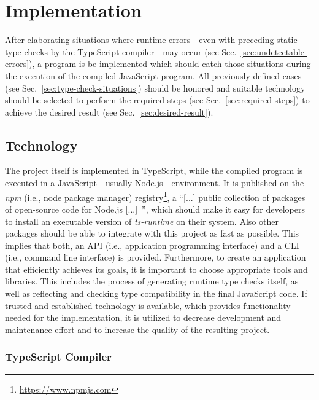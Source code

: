 \chapter{Implementation}
\label{cha:implementation}

After elaborating situations where runtime errors---even with preceding static type checks by the TypeScript compiler---may occur (see Sec.~\ref{sec:undetectable-errors}), a program is be implemented which should catch those situations during the execution of the compiled JavaScript program. All previously defined cases (see Sec.~\ref{sec:type-check-situations}) should be honored and suitable technology should be selected to perform the required steps (see Sec.~\ref{sec:required-steps}) to achieve the desired result (see Sec.~\ref{sec:desired-result}).

\section{Technology}
\label{sec:technology}

The project itself is implemented in TypeScript, while the compiled program is executed in a JavaScript---usually Node.js---environment. It is published on the \emph{npm} (i.e., node package manager) registry\footnote{\url{https://www.npmjs.com}}, a ``[...] public collection of packages of open-source code for Node.js [...]~\cite{npmjs:about}'', which should make it easy for developers to install an executable version of \emph{ts-runtime} on their system. Also other packages should be able to integrate  with this project as fast as possible. This implies that both, an API (i.e., application programming interface) and a CLI (i.e., command line interface) is provided. Furthermore, to create an application that efficiently achieves its goals, it is important to choose appropriate tools and libraries. This includes the process of generating runtime type checks itself, as well as reflecting and checking type compatibility in the final JavaScript code. If trusted and established technology is available, which provides functionality needed for the implementation, it is utilized to decrease development and maintenance effort and to increase the quality of the resulting project.

\subsection{TypeScript Compiler}
\label{sec:typescript-compiler}

